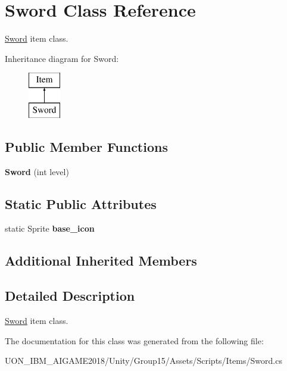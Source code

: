 \hypertarget{class_sword}{}\section{Sword Class Reference}
\label{class_sword}


\mbox{\hyperlink{class_sword}{Sword}} item class.  


Inheritance diagram for Sword\+:\begin{figure}[H]
\begin{center}
\leavevmode
\includegraphics[height=2.000000cm]{class_sword}
\end{center}
\end{figure}
\subsection*{Public Member Functions}
\begin{DoxyCompactItemize}
\item 
\mbox{\label{class_sword_ae8f29c644df340edb5b70d8e3e632c3b}} 
{\bfseries Sword} (int level)
\end{DoxyCompactItemize}
\subsection*{Static Public Attributes}
\begin{DoxyCompactItemize}
\item 
\mbox{\label{class_sword_ab0d3012c854027b952823dd99390c524}} 
static Sprite {\bfseries base\+\_\+icon}
\end{DoxyCompactItemize}
\subsection*{Additional Inherited Members}


\subsection{Detailed Description}
\mbox{\hyperlink{class_sword}{Sword}} item class. 

The documentation for this class was generated from the following file\+:\begin{DoxyCompactItemize}
\item 
U\+O\+N\+\_\+\+I\+B\+M\+\_\+\+A\+I\+G\+A\+M\+E2018/\+Unity/\+Group15/\+Assets/\+Scripts/\+Items/Sword.\+cs\end{DoxyCompactItemize}
